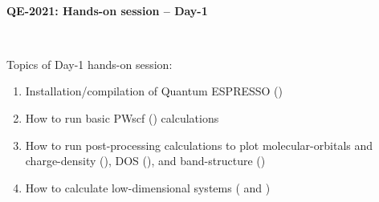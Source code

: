\documentclass[landscape]{foils}
\begin{document}

\blue
~\\
\vspace*{4cm}
\MyLogo{~}
\vspace{5em}
\begin{center}
  \centerline{\burgundy\LARGE\bf QE-2021: Hands-on session -- Day-1}
  ~\\[1.5em]  
\end{center}

Topics of Day-1 hands-on session:
\begin{enumerate}
\item Installation/compilation of Quantum ESPRESSO ()
\item How to run basic PWscf () calculations
\item How to run post-processing calculations to plot
  molecular-orbitals and charge-density (), DOS
  (), and band-structure ()
\item How to calculate low-dimensional systems ( and
  )
\end{enumerate}
    
\end{document}
